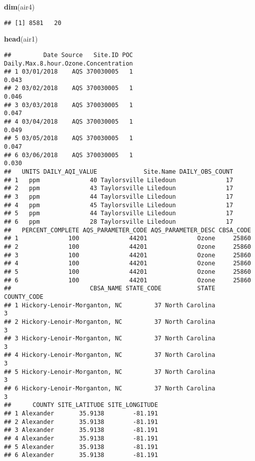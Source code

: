 \documentclass[]{article}
\newenvironment{Shaded}{\begin{snugshade}}{\end{snugshade}}
\newcommand{\KeywordTok}[1]{\textcolor[rgb]{0.13,0.29,0.53}{\textbf{#1}}}
\newcommand{\NormalTok}[1]{#1}
\begin{document}
\begin{Shaded}
\begin{Highlighting}[]
\KeywordTok{dim}\NormalTok{(air4)}
\end{Highlighting}
\end{Shaded}

\begin{verbatim}
## [1] 8581   20
\end{verbatim}

\begin{Shaded}
\begin{Highlighting}[]
\KeywordTok{head}\NormalTok{(air1)}
\end{Highlighting}
\end{Shaded}

\begin{verbatim}
##         Date Source   Site.ID POC Daily.Max.8.hour.Ozone.Concentration
## 1 03/01/2018    AQS 370030005   1                                0.043
## 2 03/02/2018    AQS 370030005   1                                0.046
## 3 03/03/2018    AQS 370030005   1                                0.047
## 4 03/04/2018    AQS 370030005   1                                0.049
## 5 03/05/2018    AQS 370030005   1                                0.047
## 6 03/06/2018    AQS 370030005   1                                0.030
##   UNITS DAILY_AQI_VALUE             Site.Name DAILY_OBS_COUNT
## 1   ppm              40 Taylorsville Liledoun              17
## 2   ppm              43 Taylorsville Liledoun              17
## 3   ppm              44 Taylorsville Liledoun              17
## 4   ppm              45 Taylorsville Liledoun              17
## 5   ppm              44 Taylorsville Liledoun              17
## 6   ppm              28 Taylorsville Liledoun              17
##   PERCENT_COMPLETE AQS_PARAMETER_CODE AQS_PARAMETER_DESC CBSA_CODE
## 1              100              44201              Ozone     25860
## 2              100              44201              Ozone     25860
## 3              100              44201              Ozone     25860
## 4              100              44201              Ozone     25860
## 5              100              44201              Ozone     25860
## 6              100              44201              Ozone     25860
##                      CBSA_NAME STATE_CODE          STATE COUNTY_CODE
## 1 Hickory-Lenoir-Morganton, NC         37 North Carolina           3
## 2 Hickory-Lenoir-Morganton, NC         37 North Carolina           3
## 3 Hickory-Lenoir-Morganton, NC         37 North Carolina           3
## 4 Hickory-Lenoir-Morganton, NC         37 North Carolina           3
## 5 Hickory-Lenoir-Morganton, NC         37 North Carolina           3
## 6 Hickory-Lenoir-Morganton, NC         37 North Carolina           3
##      COUNTY SITE_LATITUDE SITE_LONGITUDE
## 1 Alexander       35.9138        -81.191
## 2 Alexander       35.9138        -81.191
## 3 Alexander       35.9138        -81.191
## 4 Alexander       35.9138        -81.191
## 5 Alexander       35.9138        -81.191
## 6 Alexander       35.9138        -81.191
\end{verbatim}
\end{document}
